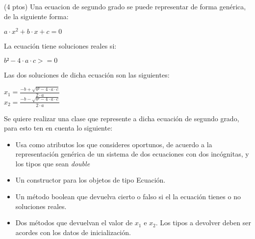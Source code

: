 \documentclass[addpoints,12pt]{exam}
\begin{document}
\begin{center}
\end{center}
\vspace{0.1in}
\begin{questions}
\question(4 ptos)  Una ecuacion de segundo grado se puede representar de forma genérica, de la siguiente forma:
\begin{large}
\begin{center}
$a \cdot x^2 + b \cdot x + c  = 0$
\end{center}
\end{large}
La ecuación tiene soluciones reales si:
\begin{center}
$b² - 4 \cdot a \cdot c  >= 0$
\end{center}
Las dos soluciones de dicha ecuación son las siguientes:
\begin{large}
\begin{center}
$x_1 = \frac{-b + \sqrt{b² - 4 \cdot a \cdot c}}{2 \cdot a}$ \\
\vspace*{0.2cm}
$x_2 = \frac{-b - \sqrt{b² - 4 \cdot a \cdot c}}{2 \cdot a}$ \\
\end{center}
\end{large}
Se quiere realizar una clase que represente a dicha ecuación de segundo grado, para esto ten en cuenta lo siguiente:
\begin{itemize}
\item Usa como atributos los que consideres oportunos, de acuerdo a la representación genérica de un sistema de dos ecuaciones con dos incógnitas, y los tipos que sean \emph{double}
\item Un constructor para los objetos de tipo Ecuación.
\item Un método boolean que devuelva cierto o falso si el la ecuación tienes o no soluciones reales.
\item Dos métodos que devuelvan el valor de $x_1$ e $x_2$. Los tipos a devolver deben ser acordes con los datos de inicialización.
\end{itemize}
\begin{parts}

\end{parts}
\end{questions}
\end{document}
